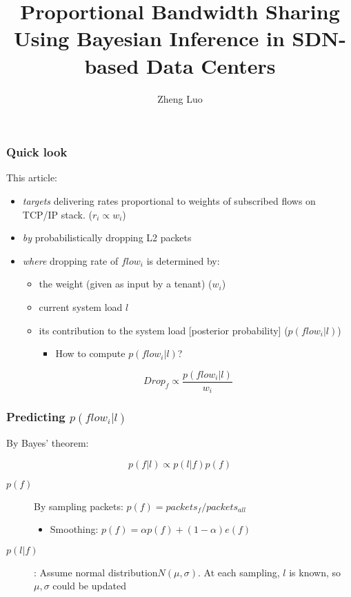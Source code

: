 \documentclass{beamer}
\title{Proportional Bandwidth Sharing Using Bayesian
Inference in SDN-based Data Centers }
\author{Zheng Luo}
\begin{document}
\begin{frame}
  \titlepage
\end{frame}

\begin{frame}
    \frametitle{Quick look}
    This article:
    
    \begin{itemize}
        \item \emph{targets} delivering rates proportional to weights of subscribed flows on TCP/IP stack. ($r_i \propto w_i$)
        \item \emph{by} probabilistically dropping L2 packets
        \item \emph{where} dropping rate of $flow_i$ is determined by:
            \begin{itemize}
                \item the weight (given as input by a tenant) ($w_i$)
                \item current system load $l$
                \item its contribution to the system load [posterior probability] ($p(flow_i|l)$)
                    \begin{itemize}
                        \item How to compute $p(flow_i|l)$?
                    \end{itemize}
            \end{itemize}
            
            \begin{equation}
                Drop_f \propto \frac{p(flow_i|l)}{w_i}
            \end{equation}
    \end{itemize}
\end{frame}

\begin{frame}
    \frametitle{Predicting $p(flow_i|l)$}
    By Bayes’ theorem:
    
    \begin{equation}
        p(f |l) \propto p(l|f)p(f)
    \end{equation}
    
    \begin{description}
        \item[$p(f)$] By sampling packets: $p(f) = packets_f / packets_{all}$ 
            \begin{itemize}
                \item Smoothing: $p(f) = \alpha p(f) + (1 - \alpha)e( f )$
            \end{itemize}
        \item[$p(l|f)$]: Assume normal distribution$N(\mu, \sigma)$. At each sampling, $l$ is known, so $\mu, \sigma$ could be updated
    \end{description}
    
    
\end{frame}
\end{document}
